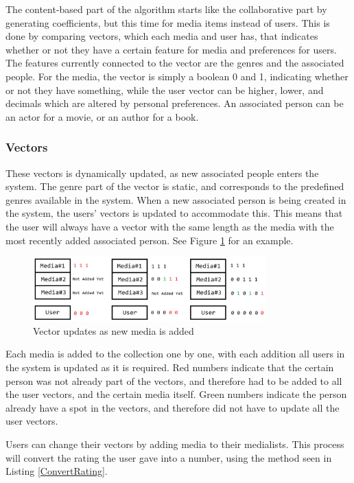 The content-based part of the algorithm starts like the collaborative part by generating coefficients, but this time for media items instead of users. This is done by comparing vectors, which each media and user has, that indicates whether or not they have a certain feature for media and preferences for users. The features currently connected to the vector are the genres and the associated people. For the media, the vector is simply a boolean 0 and 1, indicating whether or not they have something, while the user vector can be higher, lower, and decimals which are altered by personal preferences. An associated person can be an actor for a movie, or an author for a book.

\subsubsection{Vectors}

These vectors is dynamically updated, as new associated people enters the system. The genre part of the vector is static, and corresponds to the predefined genres available in the system. When a new associated person is being created in the system, the users' vectors is updated to accommodate this. This means that the user will always have a vector with the same length as the media with the most recently added associated person. See Figure \ref{VectorUpdate} for an example.

\begin{figure}[htb]
\centering
\includegraphics[width=0.8\textwidth]{Images/VectorUpdate.png}
\caption{Vector updates as new media is added}
\label{VectorUpdate}
\end{figure}

Each media is added to the collection one by one, with each addition all users in the system is updated as it is required. Red numbers indicate that the certain person was not already part of the vectors, and therefore had to be added to all the user vectors, and the certain media itself. Green numbers indicate the person already have a spot in the vectors, and therefore did not have to update all the user vectors.

Users can change their vectors by adding media to their medialists. This process will convert the rating the user gave into a number, using the method seen in Listing \ref{ConvertRating}.

